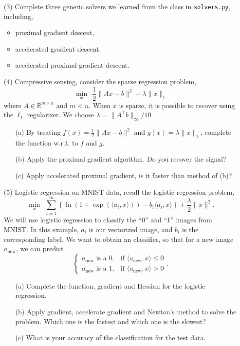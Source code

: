 \documentclass[11pt]{amsart}
\begin{document}
\begin{enumerate}
\bigskip
\item[(3)] Complete three generic solvers we learned from the class in \texttt{solvers.py}, including,
\begin{itemize}
\item proximal gradient descent,
\item accelerated gradient descent.
\item accelerated proximal gradient descent.
\end{itemize}

\vskip 32pt
\item[(4)] Compressive sensing, consider the sparse regression problem,
\[
\min_x~~\frac{1}{2}\|Ax - b\|^2 + \lambda \|x\|_1
\]
where $A\in\mathbb{R}^{m \times n}$ and $m < n$. When $x$ is sparse, it is possible to recover using the $\ell_1$ regularizer. 
We choose $\lambda = \|A^\top b\|_\infty/10$.

\vskip 16pt
\begin{enumerate}
\item[(a)] By treating $f(x) = \frac{1}{2}\|Ax - b\|^2$ and $g(x) = \lambda \|x\|_1$, complete the function w.r.t. to $f$ and $g$.
\bigskip
\item[(b)] Apply the proximal gradient algorithm. Do you recover the signal?
\bigskip
\item[(c)] Apply accelerated proximal gradient, is it faster than method of (b)?
\end{enumerate}

\vskip 32pt
\item[(5)] Logistic regression on MNIST data, recall the logistic regression problem,
\[
\min_{x}~~\sum_{i=1}^m \left\{\ln(1 + \exp(\langle a_i, x \rangle)) - b_i \langle a_i, x \rangle \right\} + \frac{\lambda}{2}\|x\|^2.
\]
We will use logistic regression to classify the ``0'' and ``1'' images from MNIST.
In this example, $a_i$ is our vectorized image, and $b_i$ is the corresponding label.
We want to obtain an classifier, so that for a new image $a_\text{new}$, we can predict
\[\begin{cases}
a_\text{new} \text{ is a 0}, &\text{if } \langle a_\text{new}, x \rangle \le 0\\
a_\text{new} \text{ is a 1}, &\text{if } \langle a_\text{new}, x \rangle > 0
\end{cases}.\]

\vskip 16pt
\begin{enumerate}
\item[(a)] Complete the function, gradient and Hessian for the logistic regression.
\bigskip
\item[(b)] Apply gradient, accelerate gradient and Newton's method to solve the problem. Which one is the fastest and which one is the slowest?
\bigskip
\item[(c)] What is your accuracy of the classification for the test data.
\end{enumerate}

\end{enumerate}
\end{document}
